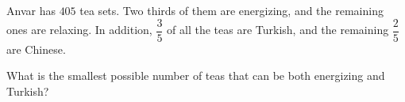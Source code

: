 Anvar has $405$ tea sets. Two thirds of them are energizing, and the remaining ones are relaxing. In addition, $\dfrac{3}{5}$ of all the teas are Turkish, and the remaining $\dfrac{2}{5}$ are Chinese.



What is the smallest possible number of teas that can be both energizing and Turkish?
